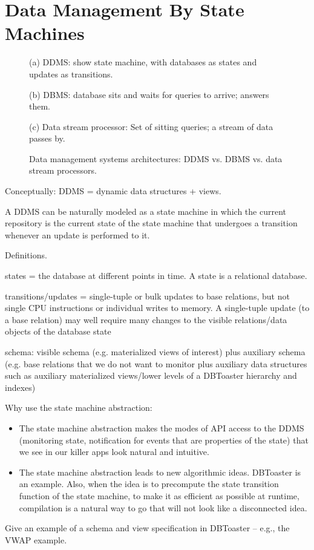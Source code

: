 

\section{Data Management By State Machines}


\begin{figure}
(a) DDMS: show state machine, with databases as states and updates as transitions.

(b) DBMS: database sits and waits for queries to arrive; answers them.

(c) Data stream processor: Set of sitting queries; a stream of data passes by.

\caption{Data management systems architectures: DDMS vs. DBMS vs. data stream processors.}
\end{figure}


Conceptually: DDMS = dynamic data structures + views.



A DDMS can be naturally modeled as a state machine in which the current repository is the current state of the state machine that undergoes a transition whenever an update is performed to it.

Definitions.

states = the database at different points in time. A state is a relational database.

transitions/updates = single-tuple or bulk updates to base relations, but not single CPU instructions or individual writes to memory. A single-tuple update (to a base relation) may well require many changes to the visible relations/data objects of the database state

schema: visible schema (e.g. materialized views of interest) plus auxiliary schema (e.g. base relations that we do not want to monitor plus auxiliary data structures such as auxiliary materialized views/lower levels of a DBToaster hierarchy and indexes)




Why use the state machine abstraction:
\begin{itemize}
\item
The state machine abstraction makes the modes of API access to the DDMS (monitoring state, notification for events that are properties of the state) that we see in our killer apps look natural and intuitive.

\item
The state machine abstraction leads to new algorithmic ideas. DBToaster is an example. Also, when the idea is to precompute the state transition function of the state machine, to make it as efficient as possible at runtime, compilation is a natural way to go that will not look like a disconnected idea.
\end{itemize}

Give an example of a schema and view specification in DBToaster -- e.g., the VWAP example.
